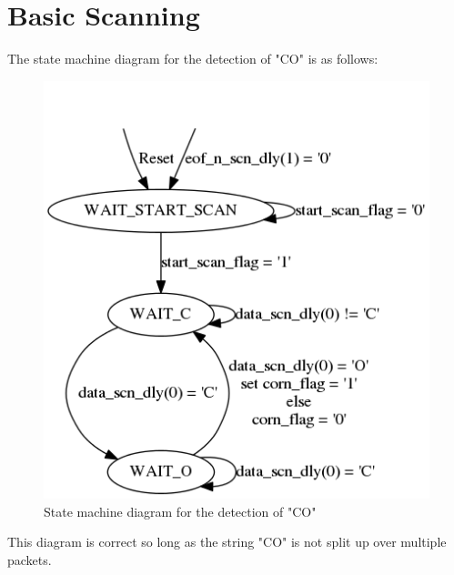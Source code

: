 \documentclass{article}
\begin{document}
\section{Basic Scanning}
The state machine diagram for the detection of "CO" is as follows:

	\begin{figure}[H]
		\begin{center}
			\includegraphics[scale=0.35]{../graphviz/part_2_state_diagram.png}
			\caption{State machine diagram for the detection of "CO"}
		\end{center}
	\end{figure}
	
This diagram is correct so long as the string "CO" is not split up over multiple packets.\\
\end{document}
